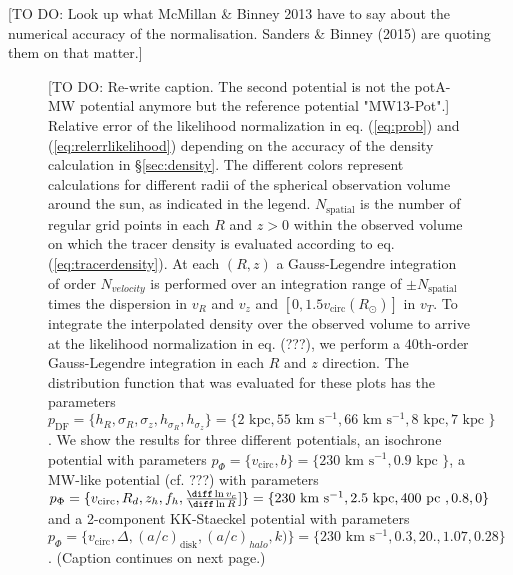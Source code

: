 [TO DO: Look up what McMillan \& Binney 2013 have to say about the numerical accuracy of the normalisation. Sanders \& Binney (2015) are quoting them on that matter.]



\begin{figure}
\caption{[TO DO: Re-write caption. The second potential is not the potA-MW potential anymore but the reference potential "MW13-Pot".] Relative error of the likelihood normalization in eq. (\ref{eq:prob}) and (\ref{eq:relerrlikelihood}) depending on the accuracy of the density calculation in \S\ref{sec:density}. The different colors represent calculations for different radii of the spherical observation volume around the sun, as indicated in the legend. $N_\text{spatial}$ is the number of regular grid points in each $R$ and $z > 0$ within the observed volume on which the tracer density is evaluated according to eq. (\ref{eq:tracerdensity}). At each $(R,z)$ a Gauss-Legendre integration of order $N_{velocity}$ is performed over an integration range of $\pm N_\text{spatial}$ times the dispersion in $v_R$ and $v_z$ and $[0,1.5v_\text{circ}(R_\odot)]$ in $v_T$. To integrate the interpolated density over the observed volume to arrive at the likelihood normalization in eq. (???), we perform a 40th-order Gauss-Legendre integration in each $R$ and $z$ direction. The distribution function that was evaluated for these plots has the parameters $p_\text{DF} = \{ h_R, \sigma_R, \sigma_z,h_{\sigma_R},h_{\sigma_z}\} =\{2 \text{ kpc}, 55 \text{ km s$^{-1}$}, 66 \text{ km s$^{-1}$}, 8 \text{ kpc}, 7 \text{ kpc }\} $. We show the results for three different potentials, an isochrone potential with parameters $p_\Phi = \{v_\text{circ},b \}=\{230 \text{ km s$^{-1}$},0.9\text{ kpc } \}$, a MW-like potential (cf. ???) with parameters $p_\Phi = \{v_\text{circ},R_d,z_h,f_h,\frac{\diff\ln v_c}{\diff\ln R}] \}=\{230 \text{ km s$^{-1}$},2.5\text{ kpc},400 \text{ pc }, 0.8,0\}$ and a 2-component KK-Staeckel potential with parameters $p_\Phi = \{v_\text{circ}, \Delta, (a/c)_\text{disk},(a/c)_{halo},k)\} = \{230\text{ km s$^{-1}$},0.3,20.,1.07, 0.28\}$. (Caption continues on next page.)} 
\label{fig:norm_accuracy}
\end{figure}

